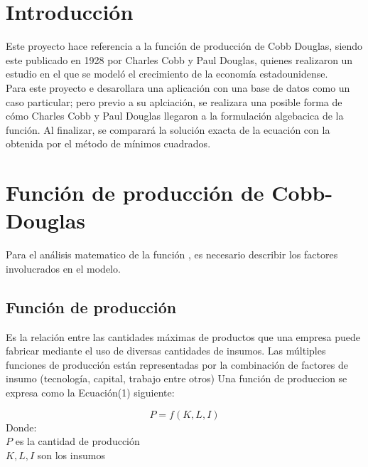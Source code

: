 \documentclass[11pt]{article}
\begin{document}
\section{Introducción}
Este proyecto hace referencia a la función de producción de Cobb Douglas, siendo este publicado en 1928 por Charles Cobb y Paul Douglas, quienes realizaron un estudio en el que se modeló el crecimiento de la economía estadounidense.\\
Para este proyecto e desarollara una aplicación con una base de datos como un caso particular; pero previo a su aplciación, se realizara una posible forma de cómo Charles Cobb y Paul Douglas llegaron a la formulación algebacica de la función. Al finalizar, se comparará la solución exacta de la ecuación con la obtenida por el método de mínimos cuadrados.

\section{Función de producción de Cobb-Douglas}
Para el análisis matematico de la función , es necesario describir los factores involucrados en el modelo.

\subsection{Función de producción}
Es la relación entre las cantidades máximas de productos que una empresa puede fabricar mediante el uso de diversas cantidades de insumos. Las múltiples funciones de producción están representadas por la combinación de factores de insumo (tecnología, capital, trabajo entre otros)
Una función de produccion se expresa como la Ecuación(1) siguiente:\

\begin{equation}\label{ec1}
    P=f(K,L,I) 
\end{equation}
Donde:\\
$P$ es la cantidad de producción\\
$K,L,I$ son los insumos


%
\end{document}
